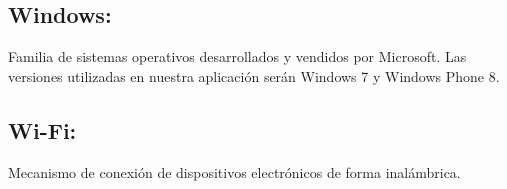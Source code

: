 \documentclass[spanish,a4paper,11pt, twoside]{report}	%
\begin{document}
\subsection{Windows:}Familia de sistemas operativos desarrollados y vendidos por Microsoft. Las versiones utilizadas en nuestra aplicación serán Windows 7 y Windows Phone 8.
\subsection{Wi-Fi:} Mecanismo de conexión de dispositivos electrónicos de forma inalámbrica.








\newpage
\mbox{}
\thispagestyle{empty}						%
\newpage

\end{document}
